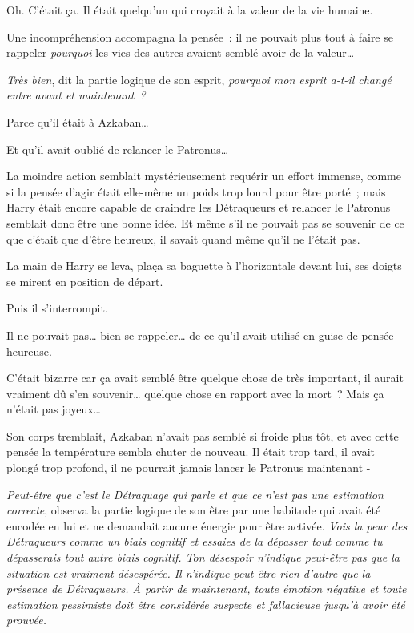 Oh. C'était ça. Il était quelqu'un qui croyait à la valeur de la vie humaine.

 Une incompréhension accompagna la pensée~: il ne pouvait plus tout à faire se rappeler \emph{pourquoi} les vies des autres avaient semblé avoir de la valeur…

\emph{Très bien}, dit la partie logique de son esprit, \emph{pourquoi mon esprit a-t-il changé entre avant et maintenant~?}

Parce qu'il était à Azkaban…

Et qu'il avait oublié de relancer le Patronus…

La moindre action semblait mystérieusement requérir un effort immense, comme si la pensée d'agir était elle-même un poids trop lourd pour être porté~; mais Harry était encore capable de craindre les Détraqueurs et relancer le Patronus semblait donc être une bonne idée. Et même s'il ne pouvait pas se souvenir de ce que c'était que d'être heureux, il savait quand même qu'il ne l'était pas.

La main de Harry se leva, plaça sa baguette à l'horizontale devant lui, ses doigts se mirent en position de départ.

Puis il s'interrompit.

Il ne pouvait pas… bien se rappeler… de ce qu'il avait utilisé en guise de pensée heureuse.

C'était bizarre car ça avait semblé être quelque chose de très important, il aurait vraiment dû s'en souvenir… quelque chose en rapport avec la mort~? Mais ça n'était pas joyeux…

Son corps tremblait, Azkaban n'avait pas semblé si froide plus tôt, et avec cette pensée la température sembla chuter de nouveau. Il était trop tard, il avait plongé trop profond, il ne pourrait jamais lancer le Patronus maintenant -

\emph{Peut-être que c'est le Détraquage qui parle et que ce n'est pas une estimation correcte}, observa la partie logique de son être par une habitude qui avait été encodée en lui et ne demandait aucune énergie pour être activée. \emph{Vois la peur des Détraqueurs comme un biais cognitif et essaies de la dépasser tout comme tu dépasserais tout autre biais cognitif. Ton désespoir n'indique peut-être pas que la situation est vraiment désespérée. Il n'indique peut-être rien d'autre que la présence de Détraqueurs. À partir de maintenant, toute émotion négative et toute estimation pessimiste doit être considérée suspecte et fallacieuse jusqu'à avoir été prouvée.}

